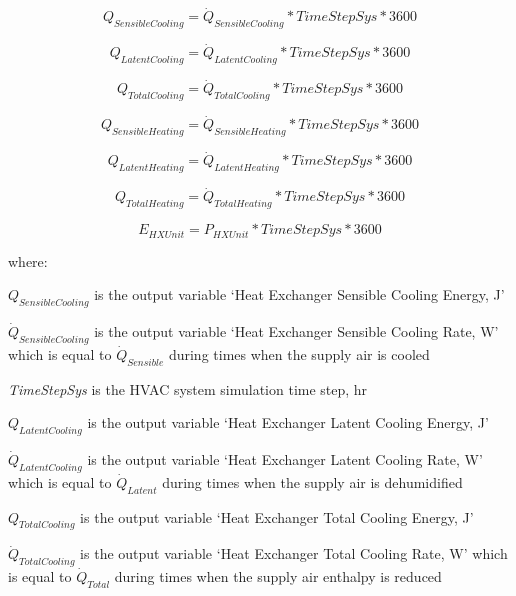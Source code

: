 \begin{equation}
{Q_{SensibleCooling}} = {\dot{Q}_{SensibleCooling}} * TimeStepSys * 3600
\end{equation}

\begin{equation}
{Q_{LatentCooling}} = {\dot{Q}_{LatentCooling}} * TimeStepSys * 3600
\end{equation}

\begin{equation}
{Q_{TotalCooling}} = {\dot{Q}_{TotalCooling}} * TimeStepSys * 3600
\end{equation}

\begin{equation}
{Q_{SensibleHeating}} = {\dot{Q}_{SensibleHeating}} * TimeStepSys * 3600
\end{equation}

\begin{equation}
{Q_{LatentHeating}} = {\dot{Q}_{LatentHeating}} * TimeStepSys * 3600
\end{equation}

\begin{equation}
{Q_{TotalHeating}} = {\dot{Q}_{TotalHeating}} * TimeStepSys * 3600
\end{equation}

\begin{equation}
{E_{HXUnit}} = {P_{HXUnit}} * TimeStepSys * 3600
\end{equation}

where:

\(Q_{SensibleCooling}\) is the output variable `Heat Exchanger Sensible Cooling Energy, J'

\({\dot{Q}_{SensibleCooling}}\) is the output variable `Heat Exchanger Sensible Cooling Rate, W' which is equal to \({\dot{Q}_{Sensible}}\) during times when the supply air is cooled

\emph{TimeStepSys} is the HVAC system simulation time step, hr

\(Q_{LatentCooling}\) is the output variable `Heat Exchanger Latent Cooling Energy, J'

\({\dot{Q}_{LatentCooling}}\) is the output variable `Heat Exchanger Latent Cooling Rate, W' which is equal to \({\dot{Q}_{Latent}}\) during times when the supply air is dehumidified

\(Q_{TotalCooling}\) is the output variable `Heat Exchanger Total Cooling Energy, J'

\({\dot{Q}_{TotalCooling}}\) is the output variable `Heat Exchanger Total Cooling Rate, W' which is equal to \({\dot{Q}_{Total}}\) during times when the supply air enthalpy is reduced


